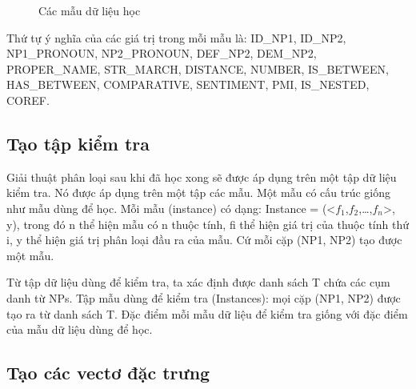 \documentclass[12pt]{report}
\begin{document}
				\begin{figure}[H]
					\centering	
					\scriptsize			
					\noindent{}
					\caption{Các mẫu dữ liệu học}
				\end{figure}

				\par Thứ tự ý nghĩa của các giá trị trong mỗi mẫu là: ID\_NP1, ID\_NP2, NP1\_PRONOUN, NP2\_PRONOUN, DEF\_NP2, DEM\_NP2, PROPER\_NAME, STR\_MARCH, DISTANCE, NUMBER, IS\_BETWEEN, HAS\_BETWEEN, COMPARATIVE, SENTIMENT, PMI, IS\_NESTED, COREF.
			\subsection*{Tạo tập kiểm tra}
				\par Giải thuật phân loại sau khi đã học xong sẽ được áp dụng trên một tập dữ liệu kiểm tra. Nó được áp dụng trên một tập các mẫu. Một mẫu có cấu trúc giống như mẫu dùng để học. Mỗi mẫu (instance) có dạng: Instance = (<$f_1$,$f_2$,…,$f_n$>, y), trong đó n thể hiện mẫu có n thuộc tính, fi thể hiện giá trị của thuộc tính thứ i, y thể hiện giá trị phân loại đầu ra của mẫu. Cứ mỗi cặp (NP1, NP2) tạo được một mẫu. 
				\par Từ tập dữ liệu dùng để kiểm tra, ta xác định được danh sách T chứa các cụm danh từ NPs. Tập mẫu dùng để kiểm tra (Instances): mọi cặp (NP1, NP2) được tạo ra từ danh sách T. Đặc điểm mỗi mẫu dữ liệu để kiểm tra giống với đặc điểm của mẫu dữ liệu dùng để học.

			\subsection*{Tạo các vectơ đặc trưng}
\end{document}
